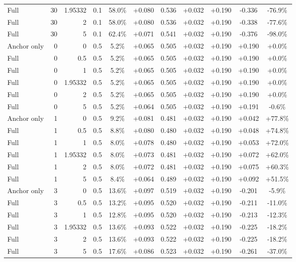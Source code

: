 \begin{table}[htbp]
\begin{tabular}{lrrrccccccc}
Full & 30 & 1.95332 & 0.1 & 58.0\% & +0.080 & 0.536 & +0.032 & +0.190 & -0.336 & -76.9\% \\
Full & 30 & 2 & 0.1 & 58.0\% & +0.080 & 0.536 & +0.032 & +0.190 & -0.338 & -77.6\% \\
Full & 30 & 5 & 0.1 & 62.4\% & +0.071 & 0.541 & +0.032 & +0.190 & -0.376 & -98.0\% \\
Anchor only & 0 & 0 & 0.5 & 5.2\% & +0.065 & 0.505 & +0.032 & +0.190 & +0.190 & +0.0\% \\
Full & 0 & 0.5 & 0.5 & 5.2\% & +0.065 & 0.505 & +0.032 & +0.190 & +0.190 & +0.0\% \\
Full & 0 & 1 & 0.5 & 5.2\% & +0.065 & 0.505 & +0.032 & +0.190 & +0.190 & +0.0\% \\
Full & 0 & 1.95332 & 0.5 & 5.2\% & +0.065 & 0.505 & +0.032 & +0.190 & +0.190 & +0.0\% \\
Full & 0 & 2 & 0.5 & 5.2\% & +0.065 & 0.505 & +0.032 & +0.190 & +0.190 & +0.0\% \\
Full & 0 & 5 & 0.5 & 5.2\% & +0.064 & 0.505 & +0.032 & +0.190 & +0.191 & -0.6\% \\
Anchor only & 1 & 0 & 0.5 & 9.2\% & +0.081 & 0.481 & +0.032 & +0.190 & +0.042 & +77.8\% \\
Full & 1 & 0.5 & 0.5 & 8.8\% & +0.080 & 0.480 & +0.032 & +0.190 & +0.048 & +74.8\% \\
Full & 1 & 1 & 0.5 & 8.0\% & +0.078 & 0.480 & +0.032 & +0.190 & +0.053 & +72.0\% \\
Full & 1 & 1.95332 & 0.5 & 8.0\% & +0.073 & 0.481 & +0.032 & +0.190 & +0.072 & +62.0\% \\
Full & 1 & 2 & 0.5 & 8.0\% & +0.072 & 0.481 & +0.032 & +0.190 & +0.075 & +60.3\% \\
Full & 1 & 5 & 0.5 & 8.4\% & +0.064 & 0.489 & +0.032 & +0.190 & +0.092 & +51.5\% \\
Anchor only & 3 & 0 & 0.5 & 13.6\% & +0.097 & 0.519 & +0.032 & +0.190 & -0.201 & -5.9\% \\
Full & 3 & 0.5 & 0.5 & 13.2\% & +0.095 & 0.520 & +0.032 & +0.190 & -0.211 & -11.0\% \\
Full & 3 & 1 & 0.5 & 12.8\% & +0.095 & 0.520 & +0.032 & +0.190 & -0.213 & -12.3\% \\
Full & 3 & 1.95332 & 0.5 & 13.6\% & +0.093 & 0.522 & +0.032 & +0.190 & -0.225 & -18.2\% \\
Full & 3 & 2 & 0.5 & 13.6\% & +0.093 & 0.522 & +0.032 & +0.190 & -0.225 & -18.2\% \\
Full & 3 & 5 & 0.5 & 17.6\% & +0.086 & 0.523 & +0.032 & +0.190 & -0.261 & -37.0\% \\

\end{tabular}
\end{table}
